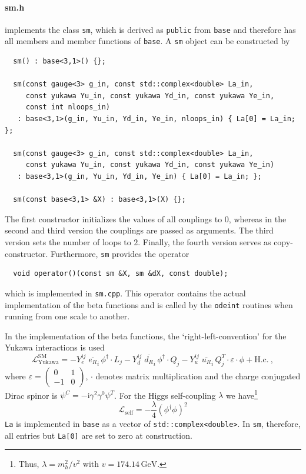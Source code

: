 \documentclass[11pt,a4paper]{article}
\begin{document}
\paragraph{sm.h}
implements the class \texttt{sm}, which is derived as \texttt{public} from \texttt{base} and therefore has all members and member functions of \texttt{base}. A \texttt{sm} object can be constructed by
\begin{lstlisting}
  sm() : base<3,1>() {};
  
  sm(const gauge<3> g_in, const std::complex<double> La_in,
     const yukawa Yu_in, const yukawa Yd_in, const yukawa Ye_in,
     const int nloops_in)
   : base<3,1>(g_in, Yu_in, Yd_in, Ye_in, nloops_in) { La[0] = La_in; };
   
  sm(const gauge<3> g_in, const std::complex<double> La_in,
     const yukawa Yu_in, const yukawa Yd_in, const yukawa Ye_in)
   : base<3,1>(g_in, Yu_in, Yd_in, Ye_in) { La[0] = La_in; };
   
  sm(const base<3,1> &X) : base<3,1>(X) {};
\end{lstlisting}
The first constructor initializes the values of all couplings to $0$, whereas in the second and third version the couplings are passed as arguments. The third version sets the number of loops to $2$.
Finally, the fourth version serves as copy-constructor.
Furthermore, \texttt{sm} provides the operator
\begin{lstlisting}
  void operator()(const sm &X, sm &dX, const double);
\end{lstlisting}
which is implemented in \texttt{sm.cpp}. This operator contains the actual implementation of the beta functions and is called by the \texttt{odeint} routines when running from one scale to another.

In the implementation of the beta functions, the `right-left-convention' for the Yukawa interactions is used
\begin{equation} \label{eq:sm_yuk}
    \mathcal{L}_{\mathrm{Yukawa}}^{\mathrm{SM}} = - Y_e^{ij}\; \overline{e_{R}}_{i} \, \phi^\dagger \cdot L_j
  - Y_d^{ij}\; \overline{d_{R}}_{i} \, \phi^\dagger \cdot Q_j
  - Y_u^{ij}\; \overline{u_{R}}_{i} \, Q_j^T \cdot \varepsilon \cdot \phi + \mathrm{H.c.}~,
\end{equation}
where $\varepsilon = \left(\begin{smallmatrix} 0 & 1 \\ -1 & 0 \end{smallmatrix}\right)$, $\cdot$ denotes matrix multiplication and the charge conjugated Dirac spinor is $\psi^C = -\mathrm{i}\gamma^2\gamma^0\psi^T$. For the Higgs self-coupling $\lambda$ we have\footnote{Thus, $\lambda = m_h^2/v^2$ with $v=174.14\,\mathrm{GeV}$.}
\begin{equation} \label{eq:sm_la}
  \mathcal{L}_{\mathrm{self}} = -\frac{\lambda}{4} (\phi^\dagger\phi)^2
\end{equation}
\texttt{La} is implemented in \texttt{base} as a vector of \texttt{std::complex<double>}. In \texttt{sm}, therefore, all entries but \texttt{La[0]} are set to zero at construction.
\end{document}

